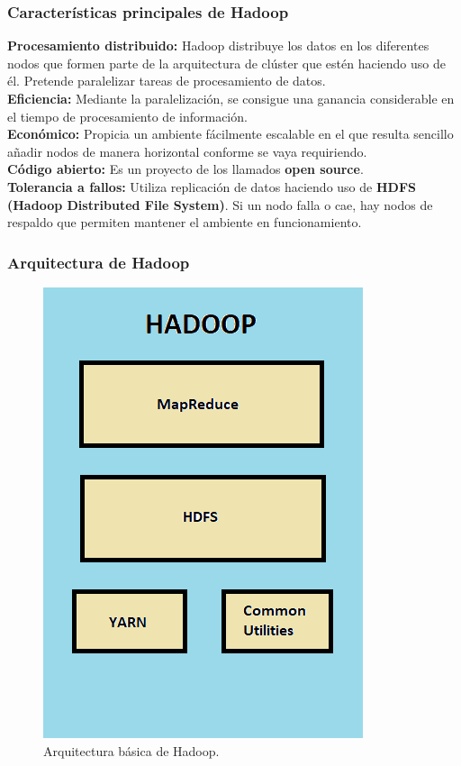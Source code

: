 \subsubsection{Características principales de Hadoop}

\begin{UClist}
	\UCli \textbf{Procesamiento distribuido:} Hadoop distribuye los datos en los diferentes nodos que formen parte de la arquitectura de clúster que estén haciendo uso de él. Pretende paralelizar tareas de procesamiento de datos.\\
	\UCli \textbf{Eficiencia:} Mediante la paralelización, se consigue una ganancia considerable en el tiempo de procesamiento de información.\\
	\UCli \textbf{Económico:} Propicia un ambiente fácilmente escalable en el que resulta sencillo añadir nodos de manera horizontal conforme se vaya requiriendo.\\
	\UCli \textbf{Código abierto:} Es un proyecto de los llamados \textbf{open source}.\\
	\UCli \textbf{Tolerancia a fallos:} Utiliza replicación de datos haciendo uso de \textbf{HDFS (Hadoop Distributed File System)}. Si un nodo falla o cae, hay nodos de respaldo que permiten mantener el ambiente en funcionamiento.\\
\end{UClist}

\newpage
\subsubsection{Arquitectura de Hadoop}
\begin{figure}[H]
	\begin{center}
		\hypertarget{fig:hadoopComponentes}{\hspace{1pt}}
		\includegraphics{capitulo2/images/hadoopComponentes.png}
		\caption{Arquitectura básica de Hadoop.}
		\label{fig:hadoopComponentes}
	\end{center}
\end{figure}


